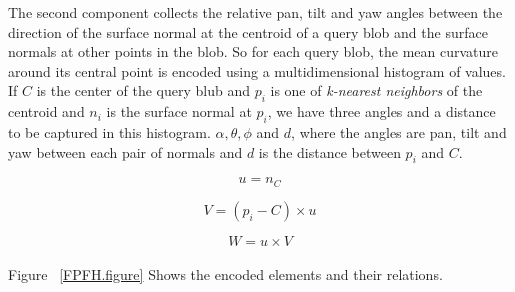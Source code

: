 The second component collects the relative pan, tilt and yaw angles between the direction of 
the surface normal at the centroid of a query blob and the surface normals at other points in the blob.
So for each query blob, the mean curvature around its central point is encoded using a multidimensional histogram of values. If $C$ is the center of the query blub and $p_i$ is one of {\it k-nearest neighbors} of the centroid and $n_i$ is the surface normal at $p_i$, we have three angles and a distance to be captured in this histogram. $\alpha,\theta, \phi$ and $d$, where the angles are pan, tilt and yaw between each pair of normals and $d$ is the distance between $p_i$ and $C$.  


\begin{equation}
 \label{VFH_geometry.eq}
    u = n_C
\end{equation}

\begin{equation}
 V = (p_i -C) \times u
\end{equation}

\begin{equation}
 W = u \times V
\end{equation}
\\    
Figure  ~\ref{FPFH.figure} Shows the encoded elements and their relations.
\\



